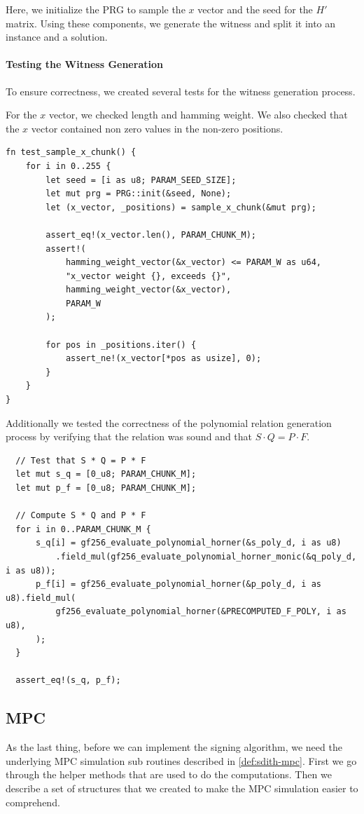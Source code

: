 \documentclass[11pt]{report}
\theoremstyle{definition}
\theoremstyle{plain}
\begin{document}
Here, we initialize the PRG to sample the $x$ vector and the seed for the $H'$ matrix. Using these components, we generate the witness and split it into an instance and a solution.

\paragraph{Testing the Witness Generation}\label{sec:testing_our_witness_generation}

To ensure correctness, we created several tests for the witness generation process.

For the $x$ vector, we checked length and hamming weight. We also checked that the $x$ vector contained non zero values in the non-zero positions.

\begin{verbatim}
fn test_sample_x_chunk() {
    for i in 0..255 {
        let seed = [i as u8; PARAM_SEED_SIZE];
        let mut prg = PRG::init(&seed, None);
        let (x_vector, _positions) = sample_x_chunk(&mut prg);

        assert_eq!(x_vector.len(), PARAM_CHUNK_M);
        assert!(
            hamming_weight_vector(&x_vector) <= PARAM_W as u64,
            "x_vector weight {}, exceeds {}",
            hamming_weight_vector(&x_vector),
            PARAM_W
        );

        for pos in _positions.iter() {
            assert_ne!(x_vector[*pos as usize], 0);
        }
    }
}
\end{verbatim}

Additionally we tested the correctness of the polynomial relation generation process by verifying that the relation was sound and that $S \cdot Q = P \cdot F$.

\begin{verbatim}
  // Test that S * Q = P * F
  let mut s_q = [0_u8; PARAM_CHUNK_M];
  let mut p_f = [0_u8; PARAM_CHUNK_M];

  // Compute S * Q and P * F
  for i in 0..PARAM_CHUNK_M {
      s_q[i] = gf256_evaluate_polynomial_horner(&s_poly_d, i as u8)
          .field_mul(gf256_evaluate_polynomial_horner_monic(&q_poly_d, i as u8));
      p_f[i] = gf256_evaluate_polynomial_horner(&p_poly_d, i as u8).field_mul(
          gf256_evaluate_polynomial_horner(&PRECOMPUTED_F_POLY, i as u8),
      );
  }

  assert_eq!(s_q, p_f);
\end{verbatim}

\subsection{MPC}\label{sub:mpc_algo}
As the last thing, before we can implement the signing algorithm, we need the underlying MPC simulation sub routines described in \autoref{def:sdith-mpc}.
First we go through the helper methods that are used to do the computations. Then we describe a set of structures that we created to make the MPC simulation easier to comprehend.
\end{document}
